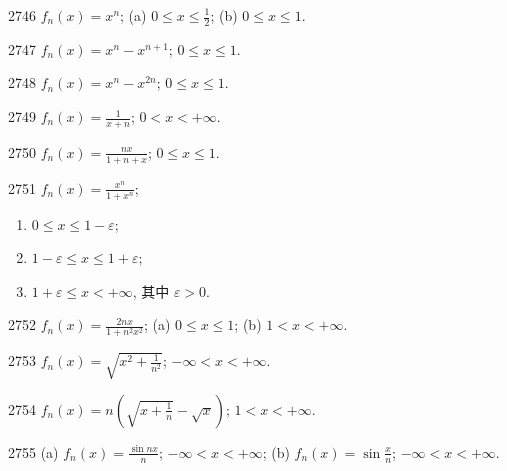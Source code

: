 
\begin{prob}[M]{2746}
$f_n(x) = x^n$; (a) $0 \leqslant x \leqslant \frac{1}{2}$; \qquad (b) $0 \leqslant x \leqslant 1$.
\end{prob}

\begin{prob}[S]{2747}
$f_n(x) = x^n - x^{n+1}$; $0 \leqslant x \leqslant 1$.
\end{prob}

\begin{prob}[S]{2748}
$f_n(x) = x^n - x^{2n}$; $0 \leqslant x \leqslant 1$.
\end{prob}

\begin{prob}[S]{2749}
$f_n(x) = \frac{1}{x+n}$; $0 < x < +\infty$.
\end{prob}

\begin{prob}[S]{2750}
$f_n(x) = \frac{nx}{1+n+x}$; $0 \leqslant x \leqslant 1$.
\end{prob}

\begin{prob}[L]{2751}
$f_n(x) = \frac{x^n}{1+x^n}$;
\begin{enumerate}[label=(\alph*), itemsep=2pt, topsep=3pt]
\item $0 \leqslant x \leqslant 1-\varepsilon$;
\item $1-\varepsilon \leqslant x \leqslant 1+\varepsilon$;
\item $1+\varepsilon \leqslant x < +\infty$, 其中 $\varepsilon > 0$.
\end{enumerate}
\end{prob}

\begin{prob}[M]{2752}
$f_n(x) = \frac{2nx}{1+n^2 x^2}$; (a) $0 \leqslant x \leqslant 1$; \qquad (b) $1 < x < +\infty$.
\end{prob}

\begin{prob}[S]{2753}
$f_n(x) = \sqrt{x^2+\frac{1}{n^2}}$; $-\infty < x < +\infty$.
\end{prob}

\begin{prob}[S]{2754}
$f_n(x) = n\left(\sqrt{x+\frac{1}{n}}-\sqrt{x}\right)$; $1 < x < +\infty$.
\end{prob}

\begin{prob}[M]{2755}
(a) $f_n(x) = \frac{\sin nx}{n}$; $-\infty < x < +\infty$; \qquad (b) $f_n(x) = \sin\frac{x}{n}$; $-\infty < x < +\infty$.
\end{prob}


